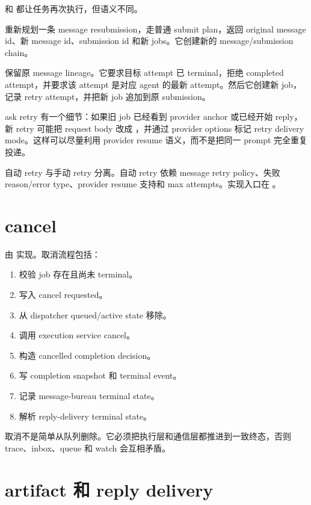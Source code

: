  和  都让任务再次执行，但语义不同。

 重新规划一条 message resubmission，走普通 submit plan，返回 original message id、新 message id、submission id 和新 jobs。它创建新的 message/submission chain。

 保留原 message lineage。它要求目标 attempt 已 terminal，拒绝 completed attempt，并要求该 attempt 是对应 agent 的最新 attempt。然后它创建新 job，记录 retry attempt，并把新 job 追加到原 submission。

ask retry 有一个细节：如果旧 job 已经看到 provider anchor 或已经开始 reply，新 retry 可能把 request body 改成 ，并通过 provider options 标记 retry delivery mode。这样可以尽量利用 provider resume 语义，而不是把同一 prompt 完全重复投递。

自动 retry 与手动 retry 分离。自动 retry 依赖 message retry policy、失败 reason/error type、provider resume 支持和 max attempts。实现入口在 。

\section{cancel}

 由  实现。取消流程包括：

\begin{enumerate}
  \item 校验 job 存在且尚未 terminal。
  \item 写入 cancel requested。
  \item 从 dispatcher queued/active state 移除。
  \item 调用 execution service cancel。
  \item 构造 cancelled completion decision。
  \item 写 completion snapshot 和 terminal event。
  \item 记录 message-bureau terminal state。
  \item 解析 reply-delivery terminal state。
\end{enumerate}

取消不是简单从队列删除。它必须把执行层和通信层都推进到一致终态，否则 trace、inbox、queue 和 watch 会互相矛盾。

\section{artifact 和 reply delivery}

